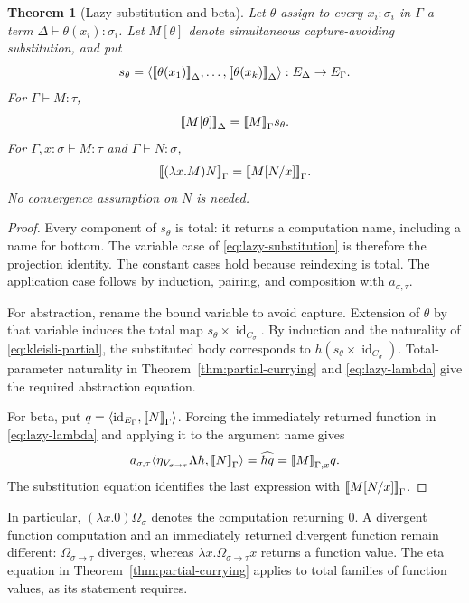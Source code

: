 \documentclass[11pt]{article}
\newtheorem{theorem}{Theorem}[section]
\theoremstyle{definition}
\newcommand{\id}{\operatorname{id}}
\newcommand{\den}[1]{\mathopen{[\mkern-3mu[}#1\mathclose{]\mkern-3mu]}}
\begin{document}
\begin{theorem}[Lazy substitution and beta]\label{thm:lazy-substitution}
Let $\theta$ assign to every $x_i:\sigma_i$ in $\Gamma$ a term
$\Delta\vdash\theta(x_i):\sigma_i$. Let $M[\theta]$ denote
simultaneous capture-avoiding substitution, and put
\[
 s_\theta=\langle\den{\theta(x_1)}_\Delta,\ldots,
                       \den{\theta(x_k)}_\Delta\rangle:
 E_\Delta\to E_\Gamma.
\]
For $\Gamma\vdash M:\tau$,
\begin{equation}\label{eq:lazy-substitution}
 \den{M[\theta]}_\Delta=\den M_\Gamma s_\theta.
\end{equation}
For $\Gamma,x:\sigma\vdash M:\tau$ and
$\Gamma\vdash N:\sigma$,
\begin{equation}\label{eq:lazy-beta}
 \den{(\lambda x.M)N}_\Gamma
       =\den{M[N/x]}_\Gamma.
\end{equation}
No convergence assumption on $N$ is needed.
\end{theorem}
\begin{proof}
Every component of $s_\theta$ is total: it returns a computation name,
including a name for bottom. The variable case of
\eqref{eq:lazy-substitution} is therefore the projection identity.
The constant cases hold because reindexing is total. The application
case follows by induction, pairing, and composition with
$a_{\sigma,\tau}$.

For abstraction, rename the bound variable to avoid capture. Extension
of $\theta$ by that variable induces the total map
$s_\theta\times\id_{C_\sigma}$. By induction and the naturality
of \eqref{eq:kleisli-partial}, the substituted body corresponds to
$h(s_\theta\times\id_{C_\sigma})$. Total-parameter naturality
in Theorem~\ref{thm:partial-currying} and
\eqref{eq:lazy-lambda} give the required abstraction equation.

For beta, put $q=\langle\id_{E_\Gamma},\den N_\Gamma\rangle$.
Forcing the immediately returned function in
\eqref{eq:lazy-lambda} and applying it to the argument name gives
\[
 a_{\sigma,\tau}
   \langle\eta_{V_{\sigma\to\tau}}\Lambda h,\den N_\Gamma\rangle
 =\widehat{hq}
 =\den M_{\Gamma,x}q.
\]
The substitution equation identifies the last expression with
$\den{M[N/x]}_\Gamma$.
\end{proof}

In particular, $(\lambda x.0)\Omega_\sigma$ denotes the computation
returning $0$. A divergent function computation and an immediately
returned divergent function remain different: $\Omega_{\sigma\to\tau}$
diverges, whereas $\lambda x.\Omega_{\sigma\to\tau}x$ returns a
function value. The eta equation in
Theorem~\ref{thm:partial-currying} applies to total families of function
values, as its statement requires.
\end{document}
